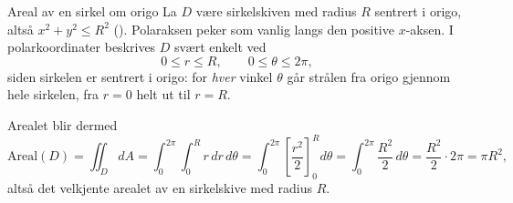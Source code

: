 \begin{eks}{Areal av en sirkel om origo}\label{eks:sirkel-origo}
La $D$ være sirkelskiven med radius $R$ sentrert i origo, altså $x^2+y^2\leq R^2$ (). Polaraksen peker som vanlig langs den positive $x$-aksen. I polarkoordinater beskrives $D$ svært enkelt ved
\[
0\leq r\leq R, \qquad 0\leq \theta \leq 2\pi,
\]
siden sirkelen er sentrert i origo: for \emph{hver} vinkel $\theta$ går strålen fra origo gjennom hele sirkelen, fra $r=0$ helt ut til $r=R$.

\begin{center}
\label{fig:sirkel-origo}
\end{center}

Arealet blir dermed
\[
\text{Areal}(D) = \iint_D dA = \int_0^{2\pi}\int_0^R r\, dr\, d\theta = \int_0^{2\pi} \left[\frac{r^2}{2}\right]_0^R d\theta = \int_0^{2\pi} \frac{R^2}{2}\, d\theta = \frac{R^2}{2}\cdot 2\pi = \pi R^2,
\]
altså det velkjente arealet av en sirkelskive med radius $R$.
\end{eks}

